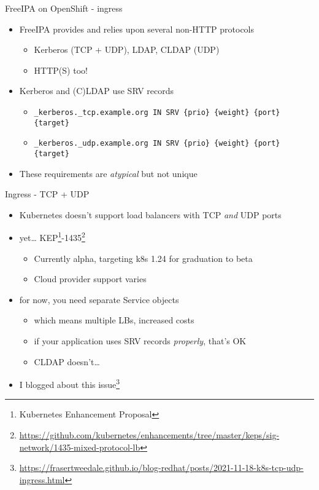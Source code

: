 \begin{frame}{FreeIPA on OpenShift - ingress}
\protect\hypertarget{freeipa-openshift-ingress}{}
\begin{itemize}
\item FreeIPA provides and relies upon several non-HTTP protocols
    \begin{itemize}
        \item Kerberos (TCP + UDP), LDAP, CLDAP (UDP)
        \item HTTP(S) too!
    \end{itemize}
\item Kerberos and (C)LDAP use SRV records
    \begin{itemize}
        \item \footnotesize {\tt \_kerberos.\_tcp.example.org IN SRV \{prio\} \{weight\} \{port\} \{target\}}
        \item \footnotesize {\tt \_kerberos.\_udp.example.org IN SRV \{prio\} \{weight\} \{port\} \{target\}}
    \end{itemize}
\item These requirements are {\em atypical} but not unique
\end{itemize}
\end{frame}


\begin{frame}{Ingress - TCP + UDP}
\protect\hypertarget{freeipa-openshift-ingress-tcp-udp}{}
\begin{itemize}

\item Kubernetes doesn't support load balancers with TCP {\em and} UDP ports

\item yet\ldots{} KEP\footnote{Kubernetes Enhancement Proposal}-1435\footnote{\url{https://github.com/kubernetes/enhancements/tree/master/keps/sig-network/1435-mixed-protocol-lb}}
  \begin{itemize}
  \item Currently alpha, targeting k8s 1.24 for graduation to beta
  \item Cloud provider support varies
  \end{itemize}

\item for now, you need separate Service objects
  \begin{itemize}
  \item which means multiple LBs, increased costs
  \item if your application uses SRV records {\em properly}, that's OK
  \item CLDAP doesn't\ldots{}
  \end{itemize}

\item I blogged about this
      issue\footnote{\url{https://frasertweedale.github.io/blog-redhat/posts/2021-11-18-k8s-tcp-udp-ingress.html}}

\end{itemize}
\end{frame}

